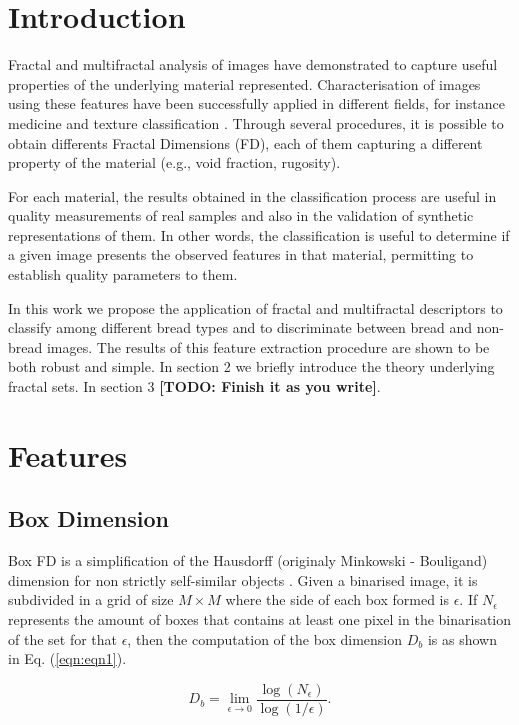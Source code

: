 \documentclass[oneside,a4paper,english,links]{amca}
\newcommand{\todo}[1]{\textbf{[TODO: #1]}}
\begin{document}
\section{Introduction}
Fractal and multifractal analysis of images have demonstrated to capture useful properties of the underlying material represented. Characterisation of images using these features have been successfully applied in different fields, for instance medicine \cite{Andjelkovic2008,Yu2011} and texture classification \cite{Wendt2009}. Through several procedures, it is possible to obtain differents Fractal Dimensions (FD), each of them capturing a different property of the material (e.g., void fraction, rugosity).

For each material, the results obtained in the classification process are useful in quality measurements of real samples and also in the validation of synthetic representations of them. In other words, the classification is useful to determine if a given image presents the observed features in that material, permitting to establish quality parameters to them.

In this work we propose the application of fractal and multifractal descriptors to classify among different bread types and to discriminate between bread and non-bread images. The results of this feature extraction procedure are shown to be both robust and simple. In section 2 we briefly introduce the theory underlying fractal sets. In section 3 \todo{Finish it as you write}.

\section{Features}
\subsection{Box Dimension}
Box FD is a simplification of the Hausdorff (originaly Minkowski - Bouligand) dimension for non strictly self-similar objects \cite{Peitgen2004}. Given a binarised image, it is subdivided in a grid of size $M\times M$ where the side of each box formed is $\epsilon$. If $N_{\epsilon}$ represents the amount of boxes that contains at least one pixel in the binarisation of the set for that $\epsilon$, then the computation of the box dimension  $D_{b}$ is as shown in Eq. (\ref{eqn:eqn1}).

\begin{equation}
D_{b} = \displaystyle\lim_{\epsilon \to 0}{\frac{\log(N_{\epsilon})}{\log (1/\epsilon)}}.
\label{eqn:eqn1}
\end{equation}
\end{document}
